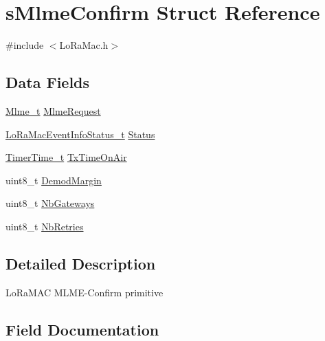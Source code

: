 \hypertarget{structsMlmeConfirm}{}\section{s\+Mlme\+Confirm Struct Reference}
\label{structsMlmeConfirm}


{\ttfamily \#include $<$Lo\+Ra\+Mac.\+h$>$}

\subsection*{Data Fields}
\begin{DoxyCompactItemize}
\item 
\hyperlink{group__LORAMAC_ga663544b83d50ec3518608be495896809}{Mlme\+\_\+t} \hyperlink{structsMlmeConfirm_a4d4f24a72592be1fbfd21d7179256088}{Mlme\+Request}
\item 
\hyperlink{group__LORAMAC_gac6ffc346a4c767f7a743c87a686c51b4}{Lo\+Ra\+Mac\+Event\+Info\+Status\+\_\+t} \hyperlink{structsMlmeConfirm_adb06d9fb17164ca72847bbdb9238800f}{Status}
\item 
\hyperlink{utilities_8h_a4215ca43d3e953099ea758ce428599d0}{Timer\+Time\+\_\+t} \hyperlink{structsMlmeConfirm_a56411a350cd4b3f8ee59adc9105e5b5e}{Tx\+Time\+On\+Air}
\item 
uint8\+\_\+t \hyperlink{structsMlmeConfirm_a802681a041b6716f179719369a3f7c21}{Demod\+Margin}
\item 
uint8\+\_\+t \hyperlink{structsMlmeConfirm_a030224406f25b8eec68e91952087a44e}{Nb\+Gateways}
\item 
uint8\+\_\+t \hyperlink{structsMlmeConfirm_a2c539bfc04286bb8f338085d8c8438dc}{Nb\+Retries}
\end{DoxyCompactItemize}


\subsection{Detailed Description}
Lo\+Ra\+M\+AC M\+L\+M\+E-\/\+Confirm primitive 

\subsection{Field Documentation}
\mbox{\label{structsMlmeConfirm_a802681a041b6716f179719369a3f7c21}} 
